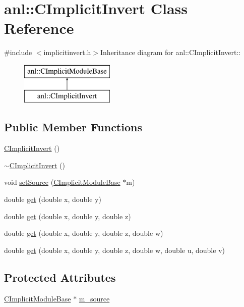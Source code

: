 \hypertarget{classanl_1_1CImplicitInvert}{
\section{anl::CImplicitInvert Class Reference}
\label{classanl_1_1CImplicitInvert}
}


{\ttfamily \#include $<$implicitinvert.h$>$}Inheritance diagram for anl::CImplicitInvert::\begin{figure}[H]
\begin{center}
\leavevmode
\includegraphics[height=2cm]{classanl_1_1CImplicitInvert}
\end{center}
\end{figure}
\subsection*{Public Member Functions}
\begin{DoxyCompactItemize}
\item 
\hyperlink{classanl_1_1CImplicitInvert_a08bdf6e919c0250c2179c7eba3a8c51a}{CImplicitInvert} ()
\item 
\hyperlink{classanl_1_1CImplicitInvert_aa11eae3c784e63fb5773488a55c83195}{$\sim$CImplicitInvert} ()
\item 
void \hyperlink{classanl_1_1CImplicitInvert_a631d00e3b2579172c0e819e3413b9d7c}{setSource} (\hyperlink{classanl_1_1CImplicitModuleBase}{CImplicitModuleBase} $\ast$m)
\item 
double \hyperlink{classanl_1_1CImplicitInvert_aa4dacdebefdd1721cdda423c41ec98b4}{get} (double x, double y)
\item 
double \hyperlink{classanl_1_1CImplicitInvert_ad6f8f7bbf36c6b7ef4fa024c316fd068}{get} (double x, double y, double z)
\item 
double \hyperlink{classanl_1_1CImplicitInvert_aa27168b58b90f1f84e199343de0a91a7}{get} (double x, double y, double z, double w)
\item 
double \hyperlink{classanl_1_1CImplicitInvert_aa09f4c5c466e8c83b0125260363d23bc}{get} (double x, double y, double z, double w, double u, double v)
\end{DoxyCompactItemize}
\subsection*{Protected Attributes}
\begin{DoxyCompactItemize}
\item 
\hyperlink{classanl_1_1CImplicitModuleBase}{CImplicitModuleBase} $\ast$ \hyperlink{classanl_1_1CImplicitInvert_af613477aad7fdc6ac95376f511c3890f}{m\_\-source}
\end{DoxyCompactItemize}


